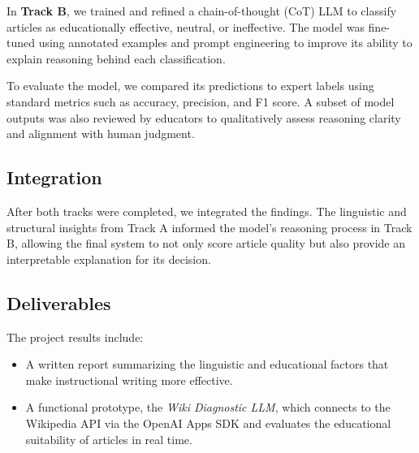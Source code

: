 In \textbf{Track B}, we trained and refined a chain-of-thought (CoT) LLM to classify articles as educationally effective, neutral, or ineffective. The model was fine-tuned using annotated examples and prompt engineering to improve its ability to explain reasoning behind each classification.

To evaluate the model, we compared its predictions to expert labels using standard metrics such as accuracy, precision, and F1 score. A subset of model outputs was also reviewed by educators to qualitatively assess reasoning clarity and alignment with human judgment.

\subsection{Integration}
After both tracks were completed, we integrated the findings. The linguistic and structural insights from Track A informed the model’s reasoning process in Track B, allowing the final system to not only score article quality but also provide an interpretable explanation for its decision.

\subsection{Deliverables}
The project results include:
\begin{itemize}
    \item A written report summarizing the linguistic and educational factors that make instructional writing more effective.
    \item A functional prototype, the \emph{Wiki Diagnostic LLM}, which connects to the Wikipedia API via the OpenAI Apps SDK and evaluates the educational suitability of articles in real time.
\end{itemize}